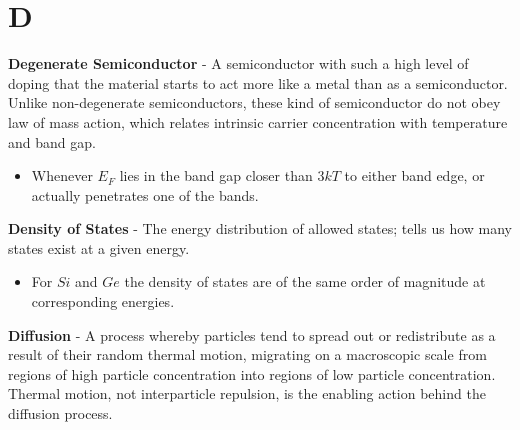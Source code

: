 \section{D}
    \textbf{Degenerate Semiconductor} - A semiconductor with such a high level of doping that the material starts to act more like a metal than as a semiconductor. Unlike non-degenerate semiconductors, these kind of semiconductor do not obey law of mass action, which relates intrinsic carrier concentration with temperature and band gap.
    \vspace{0.15cm}
    \begin{itemize}
        \setlength\itemsep{0.5em}
        \item{Whenever $E_F$ lies in the band gap closer than $3kT$ to either band edge, or actually penetrates one of the bands.}
    \end{itemize}
\vspace{0.5cm}
    \textbf{Density of States} - The energy distribution of allowed states; tells us how many states exist at a given energy.
    \vspace{0.15cm}
    \begin{itemize}
        \setlength\itemsep{0.5em}
        \item{For $Si$ and $Ge$ the density of states are of the same order of magnitude at corresponding energies.}
    \end{itemize}
\vspace{0.5cm}
    \textbf{Diffusion} - A process whereby particles tend to spread out or redistribute as a result of their random thermal motion, migrating on a macroscopic scale from regions of high particle concentration into regions of low particle concentration.  Thermal motion, not interparticle repulsion, is the enabling action behind the diffusion process.

